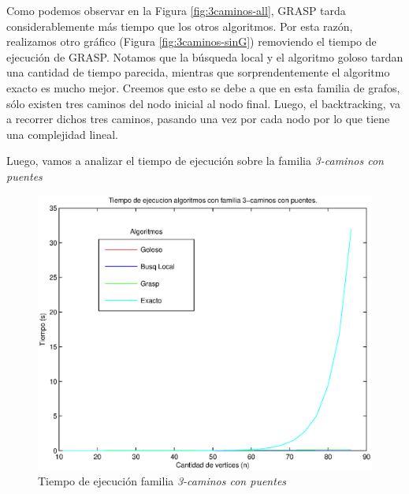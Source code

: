 Como podemos observar en la Figura \ref{fig:3caminos-all}, GRASP tarda considerablemente más tiempo que los otros algoritmos. Por esta razón, realizamos otro gráfico (Figura \ref{fig:3caminos-sinG}) removiendo el tiempo de ejecución de GRASP. Notamos que la búsqueda local y el algoritmo goloso tardan una cantidad de tiempo parecida, mientras que sorprendentemente el algoritmo exacto es mucho mejor. Creemos que esto se debe a que en esta familia de grafos, sólo existen tres caminos del nodo inicial al nodo final. Luego, el backtracking, va a recorrer dichos tres caminos, pasando una vez por cada nodo por lo que tiene una complejidad lineal.

Luego, vamos a analizar el tiempo de ejecución sobre la familia \emph{3-caminos con puentes}

\begin{figure}[H]
    \begin{minipage}{0.5\linewidth}
      \includegraphics[width=\linewidth]{graficos/todos_tiempo_puentes.eps}
      \caption{Tiempo de ejecución familia \emph{3-caminos con puentes}}\label{fig:3caminospuente-all}
    \end{minipage}
    \hfill
    \begin{minipage}{0.5\linewidth}

\end{minipage}
\end{figure}
